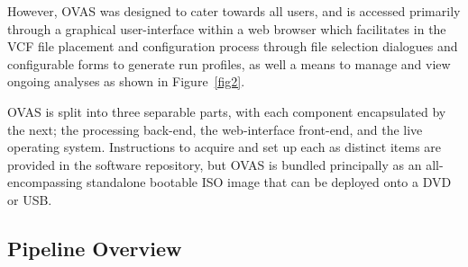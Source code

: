 \documentclass[twocolumn]{bmcart}%
\def\app{OVAS}
\newcommand{\changes}[1]{{\color{red} #1}}
\begin{document}
\changes{However, \app{} was designed to cater towards all users, and is accessed primarily through a graphical user-interface within a web browser which facilitates in the VCF file placement and configuration process through file selection dialogues and configurable forms to generate run profiles, as well a means to manage and view ongoing analyses as shown in Figure~\ref{fig2}}.

\changes{\app{} is split into three separable parts, with each component encapsulated by the next; the processing back-end, the web-interface front-end, and the live operating system. Instructions to acquire and set up each as distinct items are provided in the software repository, but \app{} is bundled principally as an all-encompassing standalone bootable ISO image that can be deployed onto a DVD or USB.}


\subsection{Pipeline Overview}
\end{document}
